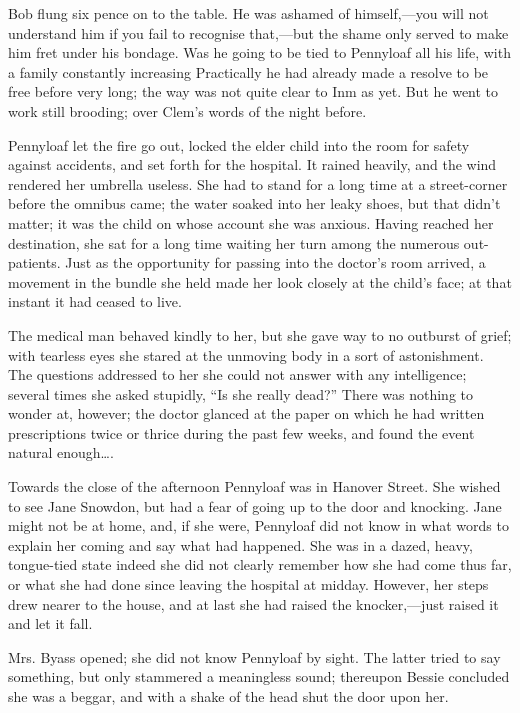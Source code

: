 Bob flung six pence on to the table. He was ashamed of himself,---you
will not understand him if you fail to recognise that,---but the shame
only served to make him fret under his bondage. Was he going to be tied
to Pennyloaf all his life, with a family constantly increasing
Practically he had already made {}a resolve to be free before very long;
the way was not quite clear to Inm as yet. But he went to work still
brooding; over Clem's words of the night before.

Pennyloaf let the fire go out, locked the elder child into the room for
safety against accidents, and set forth for the hospital. It rained
heavily, and the wind rendered her umbrella useless. She had to stand
for a long time at a street-corner before the omnibus came; the water
soaked into her leaky shoes, but that didn't matter; it was the child on
whose account she was anxious. Having reached her destination, she sat
for a long time waiting her turn among the numerous out-patients. Just
as the opportunity for passing into the doctor's room arrived, a
movement in the bundle she held made her look closely at the child's
face; at that instant it had ceased to live.

The medical man behaved kindly to her, but she gave way to no outburst
of grief; with tearless eyes she stared at the unmoving body in a sort
of astonishment. The questions addressed to her she could not answer
with any intelligence; several times she asked {}stupidly, ``Is she
really dead?'' There was nothing to wonder at, however; the doctor
glanced at the paper on which he had written prescriptions twice or
thrice during the past few weeks, and found the event natural
enough\ldots{}.

Towards the close of the afternoon Pennyloaf was in Hanover Street. She
wished to see Jane Snowdon, but had a fear of going up to the door and
knocking. Jane might not be at home, and, if she were, Pennyloaf did not
know in what words to explain her coming and say what had happened. She
was in a dazed, heavy, tongue-tied state indeed she did not clearly
remember how she had come thus far, or what she had done since leaving
the hospital at midday. However, her steps drew nearer to the house, and
at last she had raised the knocker,---just raised it and let it fall.

Mrs. Byass opened; she did not know Pennyloaf by sight. The latter tried
to say something, but only stammered a meaningless sound; thereupon
Bessie concluded she was a beggar, and with a shake of the head shut the
door upon her.


